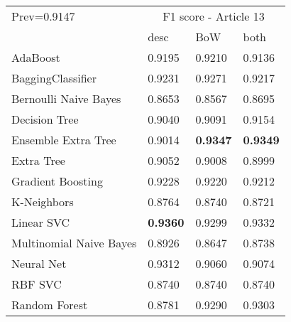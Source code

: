\begin{tabular}{|l|l|l|l| }
\hline
Prev=0.9147 &  \multicolumn{3}{c|}{F1 score - Article 13} \\
\cline{2-4} & desc & BoW & both \\ \hline
AdaBoost                & 0.9195 & 0.9210 & 0.9136\\
BaggingClassifier       & 0.9231 & 0.9271 & 0.9217\\
Bernoulli Naive Bayes   & 0.8653 & 0.8567 & 0.8695\\
Decision Tree           & 0.9040 & 0.9091 & 0.9154\\
Ensemble Extra Tree     & 0.9014 & {\bf 0.9347} & {\bf 0.9349}\\
Extra Tree              & 0.9052 & 0.9008 & 0.8999\\
Gradient Boosting       & 0.9228 & 0.9220 & 0.9212\\
K-Neighbors             & 0.8764 & 0.8740 & 0.8721\\
Linear SVC              & {\bf 0.9360} & 0.9299 & 0.9332\\
Multinomial Naive Bayes & 0.8926 & 0.8647 & 0.8738\\
Neural Net              & 0.9312 & 0.9060 & 0.9074\\
RBF SVC                 & 0.8740 & 0.8740 & 0.8740\\
Random Forest           & 0.8781 & 0.9290 & 0.9303\\
\hline
\end{tabular}